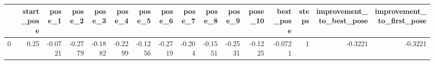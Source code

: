 \begin{tabular}{lrrrrrrrrrrrrrrr}
\toprule
{} &  start\_pose &  pose\_1 &  pose\_2 &  pose\_3 &  pose\_4 &  pose\_5 &  pose\_6 &  pose\_7 &  pose\_8 &  pose\_9 &  pose\_10 &  best\_pose &  steps &  improvement\_to\_best\_pose &  improvement\_to\_first\_pose \\
\midrule
0 &        0.25 & -0.0721 & -0.2779 & -0.1882 & -0.2299 & -0.1256 & -0.2719 &  -0.204 & -0.1551 & -0.2531 &  -0.1225 &    -0.0721 &      1 &                   -0.3221 &                    -0.3221 \\
\bottomrule
\end{tabular}
